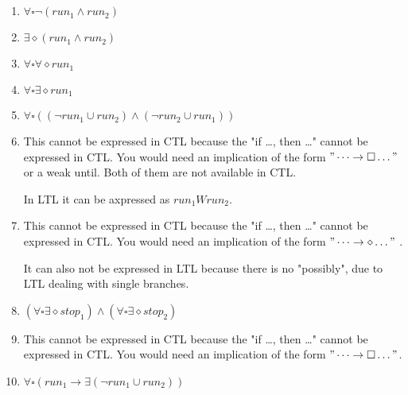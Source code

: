 \documentclass[12pt, a4paper]{article}
\begin{document}
\section{} %
\begin{enumerate}[a]
	\item %
	$\forall \square \lnot (run_1 \land run_2)$
	\item %
	$\exists \diamond (run_1 \land run_2)$
	\item %
	$\forall \square \forall \diamond run_1$
	\item %
	$\forall \square \exists \diamond run_1$
	\item %
	$\forall \square ((\lnot run_1 \cup run_2) \land (\lnot run_2 \cup run_1))$
	\item %
	This cannot be expressed in CTL because the "if \dots, then \dots" cannot be expressed in CTL. You would need an implication of the form $"\dots \rightarrow \square \dots"$ or a weak until. Both of them are not available in CTL.

	In LTL it can be axpressed as $run_1 W run_2$.
	\item %
	This cannot be expressed in CTL because the "if \dots, then \dots" cannot be expressed in CTL. You would need an implication of the form $"\dots \rightarrow \diamond \dots"$ .

	It can also not be expressed in LTL because there is no "possibly", due to LTL dealing with single branches.
	\item %
	$(\forall \square \exists \diamond stop_1) \land (\forall \square \exists \diamond stop_2)$
	\item %
	This cannot be expressed in CTL because the "if \dots, then \dots" cannot be expressed in CTL. You would need an implication of the form $"\dots \rightarrow \square \dots"$.
	\item %
	$\forall \square (run_1 \rightarrow \exists (\lnot run_1 \cup run_2))$
\end{enumerate}
\end{document}
